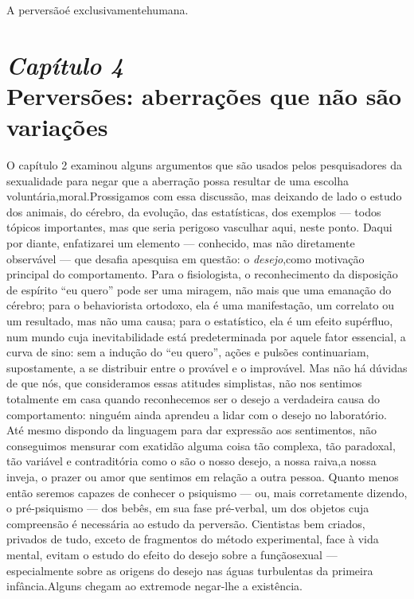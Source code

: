 A perversão\idxvaria[|)] é exclusivamente\idxanimvers[|)] humana.




\chapter[\textbf{4}\quad Perversões: aberrações que não são variações]{{\large\textit{Capítulo 4}}\\ Perversões: aberrações que não são variações}


O capítulo 2 examinou alguns argumentos que são usados pelos
pesquisadores da sexualidade para negar que a aberração possa
resultar de uma escolha voluntária,\idxpervrespo[|(] moral.\idxrespo[|(] Prossigamos com essa
discussão, mas deixando de lado o estudo dos animais, do cérebro, da
evolução, das estatísticas, dos exemplos --- todos tópicos importantes,
mas que seria perigoso vasculhar aqui, neste ponto. Daqui por diante,
enfatizarei um elemento --- conhecido, mas não diretamente observável ---
que desafia a\idxsexop[|(] pesquisa em questão: o \textit{desejo},\idxpervdesej[|(] como motivação
principal do comportamento. Para o fisiologista, o reconhecimento da
disposição de espírito ``eu quero'' pode ser uma miragem, não mais que
uma emanação do cérebro; para o behaviorista ortodoxo, ela é uma
manifestação, um correlato ou um resultado, mas não uma causa; para o
estatístico, ela é um efeito supérfluo, num mundo cuja inevitabilidade
está predeterminada por aquele fator essencial, a curva de sino: sem a
indução do ``eu quero'', ações e pulsões continuariam, supostamente, a se
distribuir entre o provável e o improvável. Mas não há dúvidas de que
nós, que consideramos essas atitudes simplistas, não nos sentimos
totalmente em casa quando reconhecemos ser o desejo a verdadeira causa
do comportamento: ninguém ainda aprendeu a lidar com o desejo no
laboratório. Até mesmo dispondo da linguagem para dar expressão aos
sentimentos, não conseguimos mensurar com exatidão alguma coisa tão
complexa, tão paradoxal, tão variável e contraditória como o são o
nosso desejo, a nossa raiva,\idxhost[|(] a nossa inveja, o prazer ou amor que
sentimos em relação a outra pessoa. Quanto menos então seremos capazes
de conhecer o psiquismo --- ou, mais corretamente dizendo, o
pré-psiquismo --- dos bebês, em sua fase pré-verbal, um dos objetos cuja
compreensão é necessária ao estudo da perversão. Cientistas bem
criados, privados de tudo, exceto de fragmentos do método experimental,
face à vida mental, evitam o estudo do efeito do desejo sobre a função\idxpervrespo[|)]
sexual --- especialmente sobre as origens do desejo nas águas
turbulentas da primeira infância.\idxrespo[|)] Alguns chegam ao extremo\idxpervdesej[|)] de negar-lhe
a existência.


